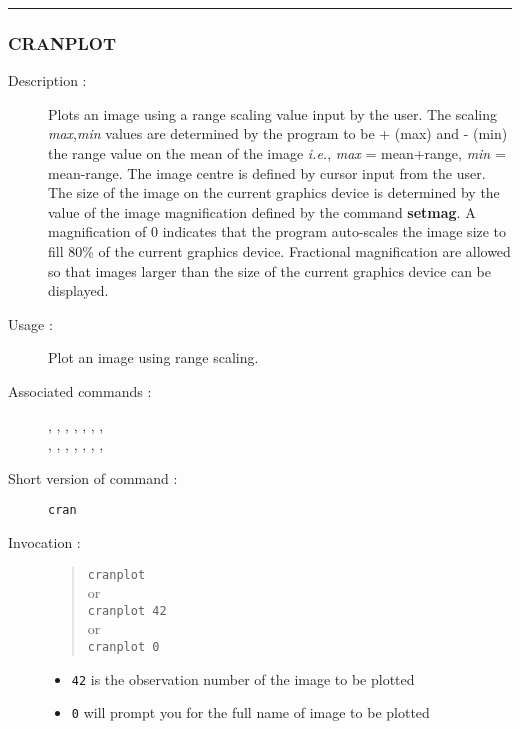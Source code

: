 \hrule 
\subsubsection*{\label{CRANPLOT}CRANPLOT}

\begin{description}

\item[Description :] Plots an image using a range scaling value input
by the user.  The scaling {\it max},{\it min} values are determined by
the program to be + (max) and - (min) the range value on the mean of
the image \emph{i.e.}, {\it max} = mean+range, {\it min} = mean-range.
The image centre is defined by cursor input from the user.  The size of
the image on the current graphics device is determined by the value of
the image magnification defined by the command {\bf setmag}.  A
magnification of 0 indicates that the program auto-scales the image
size to fill 80\% of the current graphics device.  Fractional
magnification are allowed so that images larger than the size of the
current graphics device can be displayed.

\item[Usage :] Plot an image using range scaling.

\item[Associated commands :] {\tt {}}, 
{\tt {}}, {\tt {}}, 
{\tt {}}, {\tt {}}, 
{\tt {}}, {\tt {}}, \\ 
{\tt {}}, {\tt {}}, 
{\tt {}}, {\tt {}}, 
{\tt {}}, {\tt {}}, 
{\tt {}}, {\tt {}}

\item[Short version of command :] {\tt cran}

\item[Invocation :]

\begin{quote}{\tt cranplot}\\
or \\
{\tt cranplot 42}\\
or \\
{\tt cranplot 0}
\end{quote}

\begin{itemize}
\item {\tt 42} is the observation number of the image to be plotted
\item {\tt 0} will prompt you for the full name of image to be plotted
\end{itemize}
 
\end{description}

